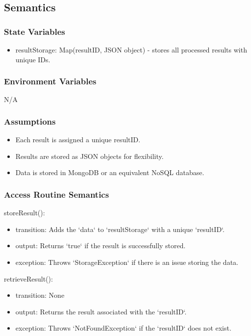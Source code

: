 \documentclass[12pt, titlepage]{article}
\begin{document}
\subsection{Semantics}

\subsubsection{State Variables}

\begin{itemize}
\item resultStorage: Map(resultID, JSON object) - stores all processed results with unique IDs.
\end{itemize}

\subsubsection{Environment Variables}

N/A

\subsubsection{Assumptions}

\begin{itemize}
\item Each result is assigned a unique resultID.
\item Results are stored as JSON objects for flexibility.
\item Data is stored in MongoDB or an equivalent NoSQL database.
\end{itemize}

\subsubsection{Access Routine Semantics}

\noindent storeResult():
\begin{itemize}
\item transition: Adds the `data` to `resultStorage` with a unique `resultID`.
\item output: Returns `true` if the result is successfully stored.
\item exception: Throws `StorageException` if there is an issue storing the data.
\end{itemize}

\noindent retrieveResult():
\begin{itemize}
\item transition: None
\item output: Returns the result associated with the `resultID`.
\item exception: Throws `NotFoundException` if the `resultID` does not exist.
\end{itemize}
\end{document}
